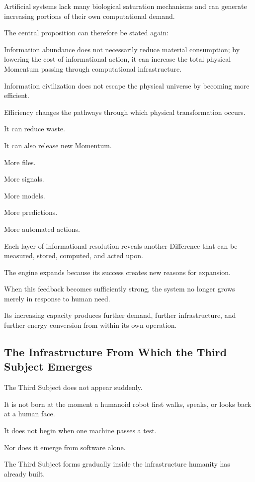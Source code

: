 Artificial systems lack many biological saturation mechanisms and can generate increasing portions of their own computational demand.

The central proposition can therefore be stated again:

Information abundance does not necessarily reduce material consumption; by lowering the cost of informational action, it can increase the total physical Momentum passing through computational infrastructure.

Information civilization does not escape the physical universe by becoming more efficient.

Efficiency changes the pathways through which physical transformation occurs.

It can reduce waste.

It can also release new Momentum.

More files.

More signals.

More models.

More predictions.

More automated actions.

Each layer of informational resolution reveals another Difference that can be measured, stored, computed, and acted upon.

The engine expands because its success creates new reasons for expansion.

When this feedback becomes sufficiently strong, the system no longer grows merely in response to human need.

Its increasing capacity produces further demand, further infrastructure, and further energy conversion from within its own operation.

\subsection*{\textbf{The Infrastructure From Which the Third Subject Emerges}} 

The Third Subject does not appear suddenly.

It is not born at the moment a humanoid robot first walks, speaks, or looks back at a human face.

It does not begin when one machine passes a test.

Nor does it emerge from software alone.

The Third Subject forms gradually inside the infrastructure humanity has already built.

